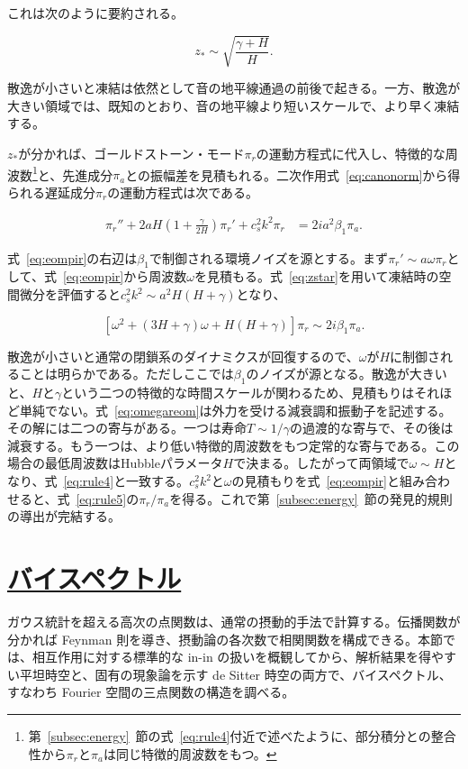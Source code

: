 \documentclass[a4paper,11pt]{ltjsarticle}
\newcommand{\sectionlink}[1]{\section[#1]{\hyperlink{toc}{#1}}}
\numberwithin{equation}{section}
\def\pia{\pi_{a}}
\def\pir{\pi_{r}}
\newcommand{\Eq}[1]{Eq.~(\ref{#1})}
\newcommand{\Sec}[1]{Sec.~\ref{#1}}
\renewcommand{\Eq}[1]{式~\eqref{#1}}
\renewcommand{\Sec}[1]{第~\ref{#1}~節}
\begin{document}
これは次のように要約される。

\begin{equation}\label{eq:zstar}
    z_{*}\sim\sqrt{\frac{\gamma+H}{H}}. 
\end{equation}

散逸が小さいと凍結は依然として音の地平線通過の前後で起きる。一方、散逸が大きい領域では、既知のとおり、音の地平線より短いスケールで、より早く凍結する\cite{LopezNacir:2011kk,Creminelli:2023aly}。

$z_*$が分かれば、ゴールドストーン・モード$\pir$の運動方程式に代入し、特徴的な周波数\footnote{\Sec{subsec:energy}の\Eq{eq:rule4}付近で述べたように、部分積分との整合性から$\pir$と$\pia$は同じ特徴的周波数をもつ。}と、先進成分$\pia$との振幅差を見積もれる。二次作用\Eq{eq:canonorm}から得られる遅延成分$\pir$の運動方程式は次である。

\begin{align}
	\pir''+2aH\left(1+\frac{\gamma}{2H}\right)\pir'+c_{s}^{2}k^{2}\pir&=2ia^{2}\beta_{1}\pia.\label{eq:eompir}
\end{align}

\Eq{eq:eompir}の右辺は$\beta_1$で制御される環境ノイズを源とする。まず$\pi_r'\sim a\omega\pi_r$として、\Eq{eq:eompir}から周波数$\omega$を見積もる。\Eq{eq:zstar}を用いて凍結時の空間微分を評価すると$c_s^2k^2\sim a^2H(H+\gamma)$となり、

\begin{equation}\label{eq:omegareom}
    \left[\omega^{2}+\left(3H+\gamma\right)\omega+H\left(H+\gamma\right)\right] \pir \sim 2i\beta_{1}\pia.
\end{equation}

散逸が小さいと通常の閉鎖系のダイナミクスが回復するので、$\omega$が$H$に制御されることは明らかである。ただしここでは$\beta_1$のノイズが源となる。散逸が大きいと、$H$と$\gamma$という二つの特徴的な時間スケールが関わるため、見積もりはそれほど単純でない。\Eq{eq:omegareom}は外力を受ける減衰調和振動子を記述する。その解には二つの寄与がある。一つは寿命$T\sim1/\gamma$の過渡的な寄与で、その後は減衰する。もう一つは、より低い特徴的周波数をもつ定常的な寄与である。この場合の最低周波数はHubbleパラメータ$H$で決まる。したがって両領域で$\omega\sim H$となり、\Eq{eq:rule4}と一致する。$c_s^2k^2$と$\omega$の見積もりを\Eq{eq:eompir}と組み合わせると、\Eq{eq:rule5}の$\pir/\pia$を得る。これで\Sec{subsec:energy}の発見的規則の導出が完結する。

\sectionlink{バイスペクトル}\label{sec:bispec}

ガウス統計を超える高次の点関数は、通常の摂動的手法で計算する。伝播関数が分かれば Feynman 則を導き、摂動論の各次数で相関関数を構成できる。本節では、相互作用に対する標準的な in-in の扱いを概観してから、解析結果を得やすい平坦時空と、固有の現象論を示す de Sitter 時空の両方で、バイスペクトル、すなわち Fourier 空間の三点関数の構造を調べる。
\end{document}

